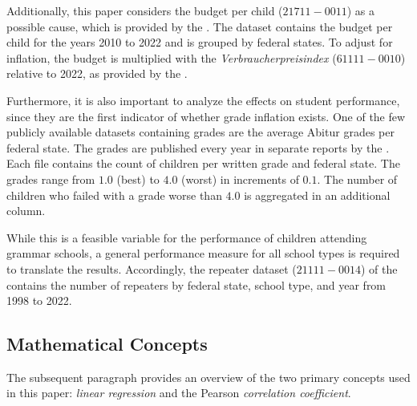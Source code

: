 Additionally, this paper considers the budget per child (\href{https://www-genesis.destatis.de/genesis//online?operation=table&code=21711-0011&bypass=true&levelindex=0&levelid=1706352648560#abreadcrumb}{$21711-0011$}) as a possible cause, which is provided  by the \citeauthor{statistische_bundesamt_statistisches_2024}. The dataset contains the budget per child for the years 2010 to 2022 and is grouped by federal states. To adjust for inflation, the budget is multiplied with the \textit{Verbraucherpreisindex} (\href{https://www-genesis.destatis.de/genesis//online?operation=table&code=61111-0010&bypass=true&levelindex=0&levelid=1706352769529#abreadcrumb}{$61111-0010$}) relative to 2022, as provided by the \citeauthor{statistische_bundesamt_statistisches_2024}. 


Furthermore, it is also important to analyze the  effects on student performance, since they are the first indicator of whether grade inflation exists. One of the few publicly available datasets containing grades are the average Abitur grades per federal state. The grades are published every year in separate reports by the \citeauthor{kultusminister_konferenz_abiturnoten_nodate}. Each file contains the count of children per written grade and federal state. The grades range from $1.0$ (best) to $4.0$ (worst) in increments of $0.1$. The number of children who failed with a grade worse than $4.0$ is aggregated in an additional column. 

While this is a feasible variable for the performance of children attending grammar schools, a general performance measure for all school types is required to translate the results. Accordingly, the repeater dataset (\href{https://www-genesis.destatis.de/genesis//online?operation=table&code=21111-0014&bypass=true&levelindex=0&levelid=1706352887288#abreadcrumb}{$21111-0014$}) of the \citeauthor{statistische_bundesamt_statistisches_2024} contains the number of repeaters by federal state, school type, and year from 1998 to 2022.


\subsection{Mathematical Concepts}
The subsequent paragraph provides an overview of the two primary concepts used in this paper: \emph{linear regression} and the Pearson \emph{correlation coefficient}.

